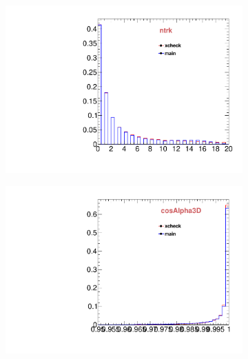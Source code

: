 \begin{figure}
        \centering
        \begin{subfigure}[b]{0.2\textwidth}
                \centering
                \includegraphics[width=\textwidth]{Figures/VariablesComparison/MC_barrel_figs/closetrk}
                \label{fig:MC_barrel_closetrk}
        \end{subfigure}
        \begin{subfigure}[b]{0.2\textwidth}
                \centering
                \includegraphics[width=\textwidth]{Figures/VariablesComparison/MC_barrel_figs/cosa}
                \label{fig:MC_barrel_cosa}
        \end{subfigure}
        \begin{subfigure}[b]{0.2\textwidth}
                \centering

\end{subfigure}
\end{figure}

